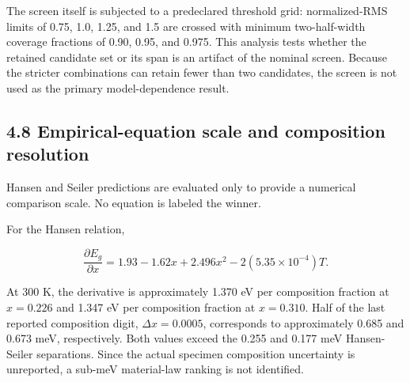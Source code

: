 The screen itself is subjected to a predeclared threshold grid:
normalized-RMS limits of 0.75, 1.0, 1.25, and 1.5 are crossed with
minimum two-half-width coverage fractions of 0.90, 0.95, and 0.975. This
analysis tests whether the retained candidate set or its span is an
artifact of the nominal screen. Because the stricter combinations can
retain fewer than two candidates, the screen is not used as the primary
model-dependence result.

\subsection{4.8 Empirical-equation scale and composition
resolution}\label{empirical-equation-scale-and-composition-resolution}

Hansen and Seiler predictions are evaluated only to provide a numerical
comparison scale. No equation is labeled the winner.

For the Hansen relation,

\[
\frac{\partial E_g}{\partial x}
=1.93-1.62x+2.496x^2-2(5.35\times10^{-4})T.
\]

At 300 K, the derivative is approximately 1.370 eV per composition
fraction at \(x=0.226\) and 1.347 eV per composition fraction at
\(x=0.310\). Half of the last reported composition digit,
\(\Delta x=0.0005\), corresponds to approximately 0.685 and 0.673 meV,
respectively. Both values exceed the 0.255 and 0.177 meV Hansen-Seiler
separations. Since the actual specimen composition uncertainty is
unreported, a sub-meV material-law ranking is not identified.
